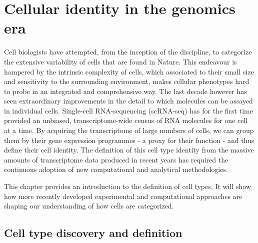 \chapter{Cellular identity in the genomics era}  %
\label{chap:intro}

\ifpdf
    \graphicspath{{Chapter1/Figs/Raster/}{Chapter1/Figs/PDF/}{Chapter1/Figs/}}
\else
    \graphicspath{{Chapter1/Figs/Vector/}{Chapter1/Figs/}}
\fi

Cell biologists have attempted, from the inception of the discipline, to categorize the extensive variability of cells that are found in Nature. This endeavour is hampered by the intrinsic complexity of cells, which associated to their small size and sensitivity to the surrounding environment, makes cellular phenotypes hard to probe in an integrated and comprehensive way. The last decade however has seen extraordinary improvements in the detail to which molecules can be assayed in individual cells. Single-cell RNA-sequencing (scRNA-seq) has for the first time provided an unbiased, transcriptome-wide census of RNA molecules for one cell at a time. By acquiring the transcriptome of large numbers of cells, we can group them by their gene expression programmes - a proxy for their function - and thus define their cell identity. The definition of this cell type identity from the massive amounts of transcriptome data produced in recent years has required the continuous adoption of new computational and analytical methodologies.

This chapter provides an introduction to the definition of cell types. It will show how more recently developed experimental and computational approaches are shaping our understanding of how cells are categorized.



\section{Cell type discovery and definition} %
\label{section1.1}


